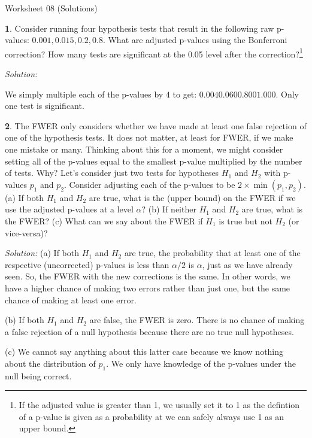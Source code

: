 \documentclass{tufte-handout}
\begin{document}
\justify

{\LARGE Worksheet 08 (Solutions)}

\vspace*{18pt}


\textbf{1}. Consider running four hypothesis tests that result in the following raw
p-values: $0.001, 0.015, 0.2, 0.8$. What are adjusted p-values using the
Bonferroni correction? How many tests are significant at the 0.05 level
after the correction?\footnote{
  If the adjusted value is greater than 1, we usually set it
  to 1 as the defintion of a p-value is given as a probability
  at we can safely always use 1 as an upper bound.
}

\textit{Solution:} %

We simply multiple each of the p-values by $4$ to get: 
$0.004 0.060 0.800 1.000$. Only one test is significant.

\textbf{2}. The FWER only considers whether we have made at least one false rejection
of one of the hypothesis tests. It does not matter, at least for FWER, if
we make one mistake or many. Thinking about this for a moment, we might
consider setting all of the p-values equal to the smallest p-value multiplied
by the number of tests. Why? Let's consider just two tests for hypotheses
$H_1$ and $H_2$ with p-values $p_1$ and $p_2$. Consider adjusting each 
of the p-values to be $2 \times \min(p_1, p_2)$. (a) If both $H_1$ and $H_2$
are true, what is the (upper bound) on the FWER if we use the adjusted
p-values at a level $\alpha$? (b) If neither $H_1$ and $H_2$ are true,
what is the FWER? (c) What can we say about the FWER if $H_1$ is true
but not $H_2$ (or vice-versa)?

\textit{Solution:} (a) If both $H_1$ and $H_2$ are true, the probability that at least one
of the respective (uncorrected) p-values is less than $\alpha / 2$ is
$\alpha$, just as we have already seen. So, the FWER with the new corrections
is the same. In other words, we have a higher chance of making two errors
rather than just one, but the same chance of making at least one error.

(b) If both $H_1$ and $H_2$ are false, the FWER is zero. There is no
chance of making a false rejection of a null hypothesis because there
are no true null hypotheses.

(c) We cannot say anything about this latter case because we know nothing
about the distribution of $p_1$. We only have knowledge of the p-values 
under the null being correct. 
\end{document}
